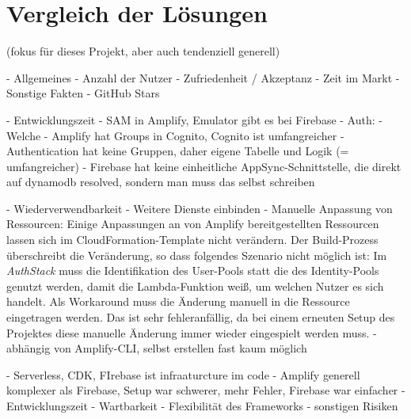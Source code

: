 \chapter{Vergleich der Lösungen}

(fokus für dieses Projekt, aber auch tendenziell generell)

- Allgemeines
  - Anzahl der Nutzer
  - Zufriedenheit / Akzeptanz
  - Zeit im Markt
  - Sonstige Fakten
  - GitHub Stars

- Entwicklungszeit
  - SAM in Amplify, Emulator gibt es bei Firebase
  - Auth:
    - Welche
    - Amplify hat Groups in Cognito, Cognito ist umfangreicher
    - Authentication hat keine Gruppen, daher eigene Tabelle und Logik (= umfangreicher)
  - Firebase hat keine einheitliche AppSync-Schnittstelle, die direkt auf dynamodb resolved, sondern man muss das selbst schreiben

- Wiederverwendbarkeit
  - Weitere Dienste einbinden
    - Manuelle Anpassung von Ressourcen: Einige Anpassungen an von Amplify bereitgestellten Ressourcen lassen sich im CloudFormation-Template nicht verändern. Der Build-Prozess überschreibt die Veränderung, so dass folgendes Szenario nicht möglich ist: Im \textit{AuthStack} muss die Identifikation des User-Pools statt die des Identity-Pools genutzt werden, damit die Lambda-Funktion weiß, um welchen Nutzer es sich handelt. Als Workaround muss die Änderung manuell in die Ressource eingetragen werden. Das ist sehr fehleranfällig, da bei einem erneuten Setup des Projektes diese manuelle Änderung immer wieder eingespielt werden muss.
    - abhängig von Amplify-CLI, selbst erstellen fast kaum möglich





 - Serverless, CDK, FIrebase ist infraaturcture im code
 - Amplify generell komplexer als Firebase, Setup war schwerer, mehr Fehler, Firebase war einfacher
- Entwicklungszeit
- Wartbarkeit
- Flexibilität des Frameworks
- sonstigen Risiken